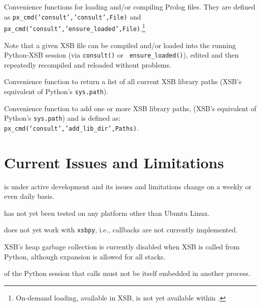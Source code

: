 \begin{description}
%
  Convenience functions for loading and/or compiling Prolog files.
  They are defined as {\tt px\_cmd('consult','consult',File)} and {\tt
    px\_cmd('consult','ensure\_loaded',File)}.\footnote{On-demand
    loading, available in XSB, is not yet available within \px{}.}

  Note that a given XSB file can be compiled and/or loaded into the
  running Python-XSB session (via {\tt consult()} or {\tt
    ensure\_loaded()}), edited and then repeatedly recompiled and
    reloaded without problems.

%  
  Convenience function to return a list of all current XSB library
  paths (XSB's equivalent of Python's {\tt sys.path}).

%  
    Convenience function to add one or more XSB library paths, (XSB's
    equivalent of Python's {\tt sys.path}) and is defined as: {\tt
      px\_cmd('consult','add\_lib\_dir',Paths)}.
  
\end{description}

\section{Current Issues and Limitations} \label{sec:px-limits}

\px{} is under active development and its issues and limitations
change on a weekly or even daily basis.

\bi
\item \px{} has not yet been tested on any platform other than Ubuntu
  Linux.
\item \px{} does not yet work with {\tt xsbpy}, i.e., callbacks are
  not currently implemented.
\item XSB's heap garbage collection is currently disabled when XSB is
  called from Python, although expansion is allowed for all stacks.
\item \pxversion{} of \px{} the Python session that calls \px{} must
  not be itself embedded in another process.
\ei  
  
 
